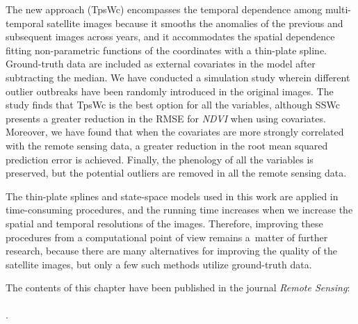 The new approach (TpsWc) encompasses the temporal dependence among multi-temporal satellite images because it smooths the anomalies of the previous and subsequent images across years, and it accommodates the spatial dependence fitting non-parametric functions of the coordinates with a thin-plate spline.
Ground-truth data are included as external covariates in the model after subtracting the median. We have conducted a simulation study wherein different outlier outbreaks have been randomly introduced in the original images.
The study finds that TpsWc is the best option for all the variables, although SSWc presents a greater reduction in the RMSE for \emph{NDVI} when using covariates. Moreover, we have found that when the covariates are more strongly
correlated with the remote sensing data, a greater reduction in the root mean squared prediction error is achieved. Finally, the phenology of all the variables is preserved, but the potential outliers are removed in all the remote sensing data.


The thin-plate splines and state-space models used in this work are applied in time-consuming procedures, and the running time increases when we increase the spatial and temporal resolutions of the images.
Therefore, improving these procedures from a computational point of view remains a~matter of further research, because there are many alternatives for improving the quality of the satellite images, but only a few such methods utilize ground-truth data.

\vfill
The contents of this chapter have been published in the journal \textit{Remote Sensing}:\\
\\ 
.
